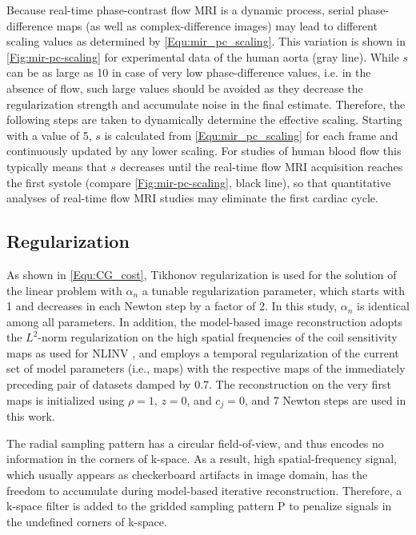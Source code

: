 Because real-time phase-contrast flow MRI is a dynamic process, serial phase-difference maps (as well as complex-difference images) may lead to different scaling values as determined by \cref{Equ:mir_pc_scaling}. This variation is shown in \cref{Fig:mir-pc-scaling} for experimental data of the human aorta (gray line). While $s$ can be as large as \num{10} in case of very low phase-difference values, i.e. in the absence of flow, such large values should be avoided as they decrease the regularization strength and accumulate noise in the final estimate. Therefore, the following steps are taken to dynamically determine the effective scaling. Starting with a value of \num{5}, $s$ is calculated from \cref{Equ:mir_pc_scaling} for each frame and continuously updated by any lower scaling. For studies of human blood flow this typically means that $s$ decreases until the real-time flow MRI acquisition reaches the first systole (compare \cref{Fig:mir-pc-scaling}, black line), so that quantitative analyses of real-time flow MRI studies may eliminate the first cardiac cycle.


\subsection{Regularization}
As shown in \cref{Equ:CG_cost}, Tikhonov regularization is used for the solution of the linear problem with $\alpha_n$ a tunable regularization parameter, which starts with \num{1} and decreases in each Newton step by a factor of \num{2}. In this study, $\alpha_n$ is identical among all parameters. In addition, the model-based image reconstruction adopts the $L^2$-norm regularization on the high spatial frequencies of the coil sensitivity maps as used for NLINV \cite{2010_20ms_Uecker,2008_NLINV,2010_NLINV_Heart,2012_PC_Joseph,2014_PC_Joseph,2015_PC_Asym}, and employs a temporal regularization of the current set of model parameters (i.e., maps) with the respective maps of the immediately preceding pair of datasets damped by \num{0.7}. The reconstruction on the very first maps is initialized using $\rho=1$, $z=0$, and $c_j=0$, and \num{7} Newton steps are used in this work.

The radial sampling pattern has a circular field-of-view, and thus encodes no information in the corners of k-space. As a result, high spatial-frequency signal, which usually appears as checkerboard artifacts in image domain, has the freedom to accumulate during model-based iterative reconstruction. Therefore, a k-space filter \cite{2001_gSENSE} is added to the gridded sampling pattern P to penalize signals in the undefined corners of k-space.


